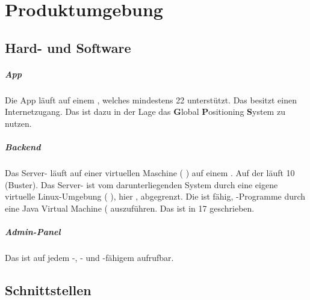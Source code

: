 \newpage
\chapter{Produktumgebung}

\section{Hard- und Software}
    \paragraph{App}
        Die App läuft auf einem %
            , welches mindestens %
            22 unterstützt.
        Das %
            besitzt einen Internetzugang.
        Das %
            ist dazu in der Lage das \textbf{G}lobal \textbf{P}ositioning \textbf{S}ystem %
            zu nutzen.

    \paragraph{Backend}
        Das Server-%
            läuft auf einer virtuellen Maschine (%
            ) auf einem %
            .
        Auf der %
            läuft %
            10 (Buster).
        Das Server-%
            ist vom darunterliegenden System durch eine eigene virtuelle Linux-Umgebung (%
            ), hier %
            , abgegrenzt.
        Die %
            ist fähig, %
            -Programme durch eine Java Virtual Machine (%
            auszuführen.
        Das %
            ist in %
            17 geschrieben.

    \paragraph{Admin-Panel}
        Das %
            ist auf jedem %
            -, %
            - und %
            -fähigem %
            aufrufbar.

\section{Schnittstellen}
